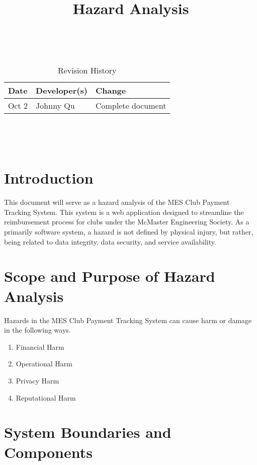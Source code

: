 \documentclass{article}
\title{Hazard Analysis\\\progname}
\author{\authname}
\date{}
\begin{document}
\maketitle
\thispagestyle{empty}

~\newpage


\begin{table}[hp]
\caption{Revision History} \label{TblRevisionHistory}
\begin{tabularx}{\textwidth}{llX}
\toprule
\textbf{Date} & \textbf{Developer(s)} & \textbf{Change}\\
\midrule
Oct 2 & Johnny Qu & Complete document\\
\bottomrule
\end{tabularx}
\end{table}

~\newpage

\tableofcontents

~\newpage


\section{Introduction}

This document will serve as a hazard analysis of the MES Club Payment Tracking System. This system is a web application designed to streamline the reimbursement process for clubs under the McMaster Engineering Society. As a primarily software system, a hazard is not defined by physical injury, but rather, being related to data integrity, data security, and service availability.

\section{Scope and Purpose of Hazard Analysis}

Hazards in the MES Club Payment Tracking System can cause harm or damage in the following ways.
\begin{enumerate}
    \item Financial Harm
    \item Operational Harm
    \item Privacy Harm
    \item Reputational Harm
\end{enumerate}

\section{System Boundaries and Components}
\end{document}
